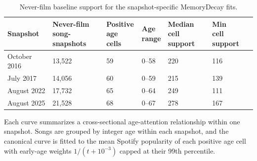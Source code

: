 \begin{table}[!htbp]
\centering
\small
\caption{Never-film baseline support for the snapshot-specific MemoryDecay fits.}
\label{tab:si-memorydecay-support}
\begin{tabular}{llllll}
\toprule
Snapshot & \makecell[b]{Never-film\\ song-snapshots} & \makecell[b]{Positive\\ age cells} & \makecell[b]{Age\\ range} & \makecell[b]{Median\\ cell support} & \makecell[b]{Min\\ cell support} \\
\midrule
October 2016 & 13,522 & 59 & 0--58 & 220 & 116 \\
July 2017 & 14,056 & 60 & 0--59 & 215 & 139 \\
August 2022 & 17,732 & 65 & 0--64 & 249 & 111 \\
August 2025 & 21,528 & 68 & 0--67 & 278 & 167 \\
\bottomrule
\end{tabular}
\begin{flushleft}\footnotesize
Each curve summarizes a cross-sectional age-attention relationship within one snapshot. Songs are grouped by integer age within each snapshot, and the canonical curve is fitted to the mean Spotify popularity of each positive age cell with early-age weights $1/(t+10^{-3})$ capped at their 99th percentile.
\end{flushleft}
\end{table}
